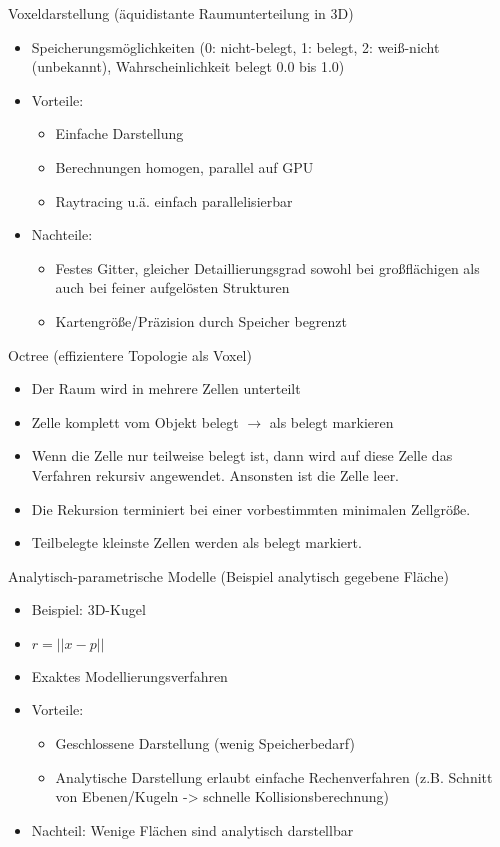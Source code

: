 \documentclass[paper=a4, fontsize=11pt]{scrartcl} %
\numberwithin{equation}{section} %
\numberwithin{figure}{section} %
\numberwithin{table}{section} %
\begin{document}
Voxeldarstellung (äquidistante Raumunterteilung in 3D)
\begin{itemize}
\item Speicherungsmöglichkeiten (0: nicht-belegt, 1: belegt, 2: weiß-nicht (unbekannt), Wahrscheinlichkeit belegt 0.0 bis 1.0)
\item Vorteile:
\begin{itemize}
\item Einfache Darstellung
\item Berechnungen homogen, parallel auf GPU
\item Raytracing u.ä. einfach parallelisierbar
\end{itemize}
\item Nachteile:
\begin{itemize}
\item Festes Gitter, gleicher Detaillierungsgrad sowohl bei großflächigen als auch bei feiner aufgelösten Strukturen
\item Kartengröße/Präzision durch Speicher begrenzt
\end{itemize}
\end{itemize}

Octree (effizientere Topologie als Voxel)
\begin{itemize}
\item Der Raum wird in mehrere Zellen unterteilt
\item Zelle komplett vom Objekt belegt $\rightarrow$ als belegt markieren
\item Wenn die Zelle nur teilweise belegt ist, dann wird auf diese Zelle das Verfahren rekursiv angewendet. Ansonsten ist die Zelle leer.
\item Die Rekursion terminiert bei einer vorbestimmten minimalen Zellgröße.
\item Teilbelegte kleinste Zellen werden als belegt markiert.
\end{itemize}

Analytisch-parametrische Modelle (Beispiel analytisch gegebene Fläche)
\begin{itemize}
\item Beispiel: 3D-Kugel
\item $r = ||x-p||$
\item Exaktes Modellierungsverfahren
\item Vorteile:
\begin{itemize}
\item Geschlossene Darstellung (wenig Speicherbedarf)
\item Analytische Darstellung erlaubt einfache Rechenverfahren (z.B. Schnitt von Ebenen/Kugeln -> schnelle Kollisionsberechnung)
\end{itemize}
\item Nachteil: Wenige Flächen sind analytisch darstellbar
\end{itemize}
\end{document}
